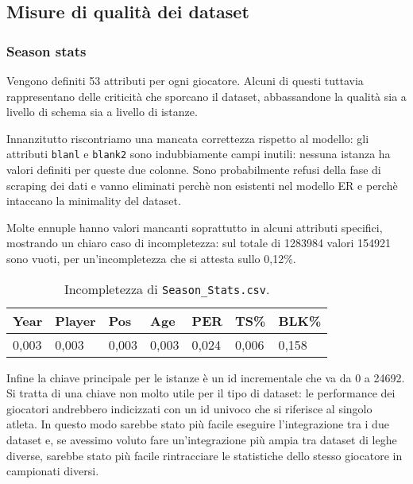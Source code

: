\subsection{Misure di qualità dei dataset}

\subsubsection{Season stats}

Vengono definiti 53 attributi per ogni giocatore. Alcuni di questi tuttavia rappresentano delle criticità che sporcano il dataset, abbassandone la qualità sia a livello di schema sia a livello di istanze.
\par
Innanzitutto riscontriamo una mancata correttezza rispetto al modello: gli attributi \texttt{blanl} e \texttt{blank2} sono indubbiamente campi inutili: nessuna istanza ha valori definiti per queste due colonne. Sono probabilmente refusi della fase di scraping dei dati e vanno eliminati perchè non esistenti nel modello ER e perchè intaccano la minimality del dataset.
\par
Molte ennuple hanno valori mancanti soprattutto in alcuni attributi specifici, mostrando un chiaro caso di incompletezza: sul totale di 1283984 valori 154921 sono vuoti, per un’incompletezza che si attesta sullo 0,12\%.

\begin{center}
	\begin{longtable}[m]{|m{3em} m{3em} m{3em} m{3em} m{3em} m{3em} m{3em}|} 

		\caption{Incompletezza di \texttt{Season\_Stats.csv}.\label{long}}\\
		\hline
		\bfseries{Year} & \bfseries{Player} & \bfseries{Pos} & \bfseries{Age} & \bfseries{PER} & \bfseries{TS\%} & \bfseries{BLK\%} \\ 
		\hline
		0,003 & 0,003 & 0,003 & 0,003 & 0,024 & 0,006 & 0,158 \\
		\hline
	\end{longtable}
\end{center}

Infine la chiave principale per le istanze è un id incrementale che va da 0 a 24692. Si tratta di una chiave non molto utile per il tipo di dataset: le performance dei giocatori andrebbero indicizzati con un id univoco che si riferisce al singolo atleta. In questo modo sarebbe stato più facile eseguire l’integrazione tra i due dataset e, se avessimo voluto fare un’integrazione più ampia tra dataset di leghe diverse, sarebbe stato più facile rintracciare le statistiche dello stesso giocatore in campionati diversi.

